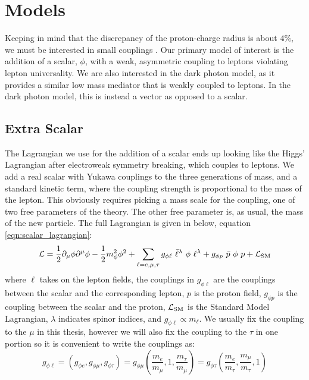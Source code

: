 \section{Models}

Keeping in mind that the discrepancy of the proton-charge radius is about $4\%$, we must be interested in small couplings \cite{Carlson:2015jba}.
Our primary model of interest is the addition of a scalar, $\phi$, with a weak, asymmetric coupling to leptons violating lepton universality.
We are also interested in the dark photon model, as it provides a similar low mass mediator that is weakly coupled to leptons.
In the dark photon model, this is instead a vector as opposed to a scalar.

\subsection{Extra Scalar}
The Lagrangian we use for the addition of a scalar ends up looking like the Higgs' Lagrangian after electroweak symmetry breaking, which couples to leptons.
We add a real scalar with Yukawa couplings to the three generations of mass, and a standard kinetic term, where the coupling strength is proportional to the mass of the lepton.
This obviously requires picking a mass scale for the coupling, one of two free parameters of the theory.
The other free parameter is, as usual, the mass of the new particle.
The full Lagrangian is given in below, equation \ref{eqn:scalar_lagrangian}:  
\begin{equation}
\label{eqn:scalar_lagrangian}
\operatorname{\mathcal{L}} = \frac{1}{2}\partial_\mu \phi \partial^\mu \phi - \frac{1}{2} m_\phi^2 \phi^2 + \sum_{\ell=e,\mu,\tau} g_{\phi \ell}~\bar{\ell}^\lambda~\phi~\ell^\lambda + g_{\phi p}~\bar{p}~\phi~p + \operatorname{\mathcal{L}}_{\textrm{SM}}
\end{equation} 
where $\ell$ takes on the lepton fields, the couplings in $g_{\phi \ell}$ are the couplings between the scalar and the corresponding lepton, $p$ is the proton field, $g_{\phi p}$ is the coupling between the scalar and the proton, $\operatorname{\mathcal{L}}_\textrm{SM}$ is the Standard Model Lagrangian, $\lambda$ indicates spinor indices, and $g_{\phi \ell} \propto m_\ell$.
We usually fix the coupling to the $\mu$ in this thesis, however we will also fix the coupling to the $\tau$ in one portion so it is convenient to write the couplings as:
\begin{equation*}
\label{eqn:coupling_mass}
g_{\phi \ell} = \left(g_{\phi e}, g_{\phi \mu}, g_{\phi \tau}\right) = g_{\phi \mu} \left( \frac{m_e}{m_\mu}, 1, \frac{m_\tau}{m_\mu} \right) = g_{\phi \tau} \left( \frac{m_e}{m_\tau}, \frac{m_\mu}{m_\tau}, 1 \right)
\end{equation*}

